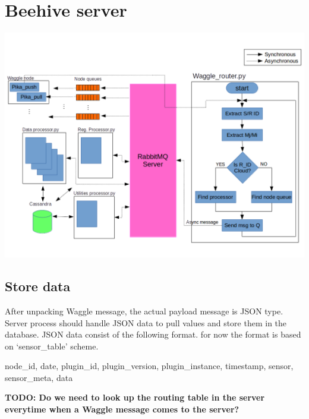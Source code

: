 \section{Beehive server}

\includegraphics[width=\textwidth]{beehive_diagram.png}

\subsection{Store data}

After unpacking Waggle message, the actual payload message is JSON type. Server process should handle JSON data to pull values and store them in the database. 
JSON data consist of the following format. for now the format is based on `sensor\_table' scheme.

\begin{framed}
\noindent
node\_id, date, plugin\_id, plugin\_version, plugin\_instance, timestamp, sensor, sensor\_meta, data
\end{framed}

\textbf{TODO: Do we need to look up the routing table in the server everytime when a Waggle message comes to the 
server?}